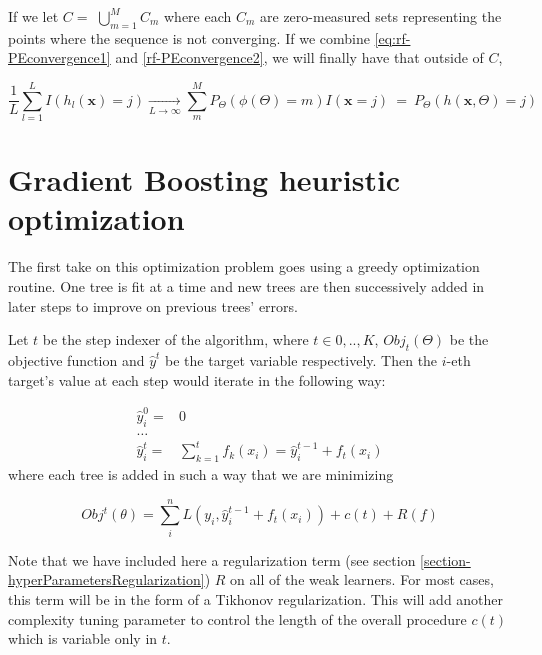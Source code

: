 \begin{appendices}
If we let $C = $ $\bigcup\limits_{m=1}^{M} C_{m}$ where each $C_m$ are zero-measured sets representing the points where the sequence is not converging.
If we combine \cref{eq:rf-PEconvergence1} and \cref{rf-PEconvergence2}, we will finally have that outside of $C$,

\begin{equation}
\frac{1}{L} \sum_{l=1}^L I(h_l(\textbf{x}) = j) \xrightarrow[L \to \infty]{} \sum_m^M  P_{\Theta}(\phi(\Theta)= m) I(\textbf{x} =j ) \ = \ P_{\Theta}(h(\textbf{x}, \Theta) = j)
\end{equation}

\section{Gradient Boosting heuristic optimization}\label{appx:sec:boosting_optimization_heuristic}

The first take on this optimization problem goes using a greedy optimization routine.
One tree is fit at a time and new trees are then successively added in later steps to improve on previous trees' errors.

Let $t$ be the step indexer of the algorithm, where $t \in {0,..,K}$, $Obj_t(\Theta)$ be the objective function and $\hat{y}^t$ be the target variable respectively.
Then the $i$-eth target's value at each step would iterate in the following way:

\begin{equation}\label{eq:gb-targetSteps}
\begin{split}
\hat{y}_i^0 = & 0 \\
\ldots \\
\hat{y}_i^t = &\sum_{k=1}^{t} f_k(x_i) = \hat{y}^{t-1}_i + f_t(x_i)
\end{split}
\end{equation}
where each tree is added in such a way that we are minimizing

\begin{equation}
Obj^t(\theta) = \sum_i^n L(y_i, \hat{y}^{t-1}_i + f_t(x_i) ) + c(t) + R(f)
\end{equation}


Note that we have included here a regularization term (see section \cref{section-hyperParametersRegularization}) $R$ on all of the weak learners.
For most cases, this term will be in the form of a Tikhonov regularization.
This will add another complexity tuning parameter to control the length of the overall procedure $c(t)$ which is variable only in $t$.


\end{appendices}
